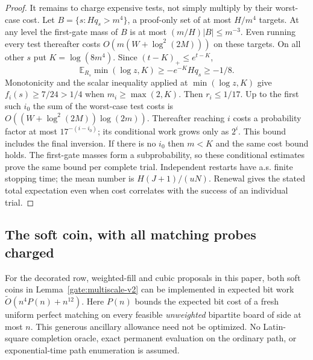 \begin{proof}
It remains to charge expensive tests, not simply multiply by their
worst-case cost. Let $B=\{s:Hq_s>m^4\}$, a proof-only set of at most
$H/m^4$ targets. At any level the first-gate mass of $B$ is at most
$(m/H)|B|\le m^{-3}$. Even running every test thereafter costs
$O(m(W+\log^2(2M)))$ on these targets. On all other $s$ put
$K=\log(8m^4)$. Since $(t-K)_+\le e^{t-K}$,
\[
 \mathbb E_{R_s}\min(\log z,K)\ge -e^{-K}Hq_s\ge-1/8 .
\]
Monotonicity and the scalar inequality applied at
$\min(\log z,K)$ give $f_i(s)\ge7/24>1/4$ when $m_i\ge\max(2,K)$.
Then $r_i\le1/17$. Up to the first such $i_0$ the sum of the
worst-case test costs is $O((W+\log^2(2M))\log(2m))$.
Thereafter reaching $i$ costs a probability factor at most
$17^{-(i-i_0)}$; its conditional work grows only as $2^i$.
This bound includes the final inversion. If there is no $i_0$ then
$m<K$ and the same cost bound holds. The first-gate masses form a
subprobability, so these conditional estimates prove the same bound
per complete trial. Independent restarts have a.s. finite stopping
time; the mean number is $H(J+1)/(uN)$. Renewal gives the stated
total expectation even when cost correlates with the success of an
individual trial.
\end{proof}

\subsection{The soft coin, with all matching probes charged}

\begin{lemma}\label{gate:binary-v2}
For the decorated row, weighted-fill and cubic proposals in this
paper, both soft coins in Lemma~\ref{gate:multiscale-v2} can be
implemented in expected bit work
$\widetilde O(n^4P(n)+n^{12})$. Here $P(n)$ bounds the expected
bit cost of a fresh uniform perfect matching on every feasible
\emph{unweighted} bipartite board of side at most $n$. This generous
ancillary allowance need not be optimized. No Latin-square completion
oracle, exact permanent evaluation on the ordinary path, or
exponential-time path enumeration is assumed.
\end{lemma}

